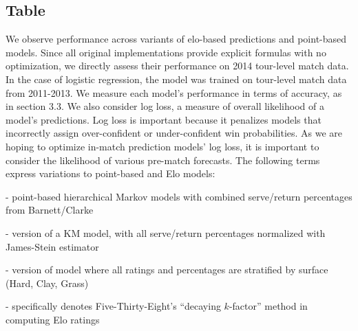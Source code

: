 \documentclass[chapterprefix=false]{report}
\begin{document}
\subsection{Table}
We observe performance across variants of elo-based predictions and point-based models. Since all original implementations provide explicit formulas with no optimization, we directly assess their performance on 2014 tour-level match data. In the case of logistic regression, the model was trained on tour-level match data from 2011-2013. We measure each model's performance in terms of accuracy, as in section 3.3. We also consider log loss, a measure of overall likelihood of a model's predictions. Log loss is important because it penalizes models that incorrectly assign over-confident or under-confident win probabilities. As we are hoping to optimize in-match prediction models' log loss, it is important to consider the likelihood of various pre-match forecasts. The following terms express variations to point-based and Elo models:

\begin{description}[leftmargin=2.5cm, labelindent=2.5cm]
\item[KM] - point-based hierarchical Markov models with combined serve/return percentages from Barnett/Clarke

\item[James-Stein] - version of a KM model, with all serve/return percentages normalized with James-Stein estimator

\item[surface] - version of model where all ratings and percentages are stratified by surface (Hard, Clay, Grass)

\item[538] - specifically denotes Five-Thirty-Eight's ``decaying $k$-factor'' method in computing Elo ratings
\end{description}
\end{document}

